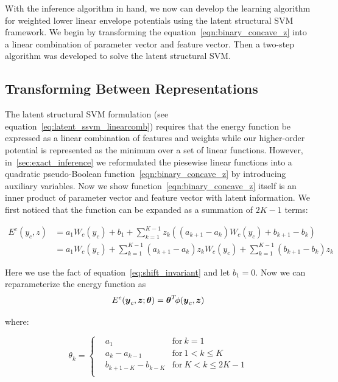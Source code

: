 With the inference algorithm in hand, we now can develop the
learning algorithm for weighted lower linear envelope potentials
using the latent structural SVM framework. We begin by
transforming the equation~\eqref{eqn:binary_concave_z} into a
linear combination of parameter vector and feature vector. Then a
two-step algorithm was developed to solve the latent structural
SVM.


\subsection{Transforming Between Representations}
\label{sec:latent_linEnv_represent}

The latent structural SVM formulation (see
equation~\eqref{eq:latent_ssvm_linearcomb}) requires that the
energy function be expressed as a linear combination of features
and weights while our higher-order potential is represented as
the minimum over a set of linear functions. However,
in~\ref{sec:exact_inference} we reformulated the piesewise linear
functions into a quadratic pseudo-Boolean
function~\eqref{eqn:binary_concave_z} by introducing auxiliary
variables. Now we show function~\eqref{eqn:binary_concave_z}
itself is an inner product of parameter vector and feature vector
with latent information. We first noticed that the function can
be expanded as a summation of $2K-1$ terms:

\begin{align}
  \label{eq:originalenergy}
  E^c(y_c,z)&=a_1W_c(y_c)+b_1+\sum_{k=1}^{K-1}z_k((a_{k+1}-a_k)W_c(y_c)+b_{k+1}-b_k)\nonumber\\ 
            &=a_1W_c(y_c)+\sum_{k=1}^{K-1}(a_{k+1}-a_k)z_kW_c(y_c)+\sum_{k=1}^{K-1}(b_{k+1}-b_k)z_k
\end{align}

Here we use the fact of equation~\eqref{eq:shift_invariant} and
let $b_1=0$. Now we can reparameterize the energy function
as
\begin{align}
  \label{eq:llsvm_innerprod_energy}
  E^c({\boldsymbol{y}}_c,{\boldsymbol{z}}; \boldsymbol{\theta}) = \boldsymbol{\theta}^T \! \phi({\boldsymbol{y}}_c,{\boldsymbol{z}})
\end{align}

\noindent where:

\begin{equation}
\label{eq:llsvm_param}
  \theta_k = \left\{
    \begin{aligned}
      & a_1	& \text{for} \ k=1\\
      & a_k-a_{k-1} & \text{for}\ 1< k \leq K\\
      & b_{k+1-K}-b_{k-K} & \text{for} \ K<k\le2K-1\\
    \end{aligned}
  \right.
\end{equation}

